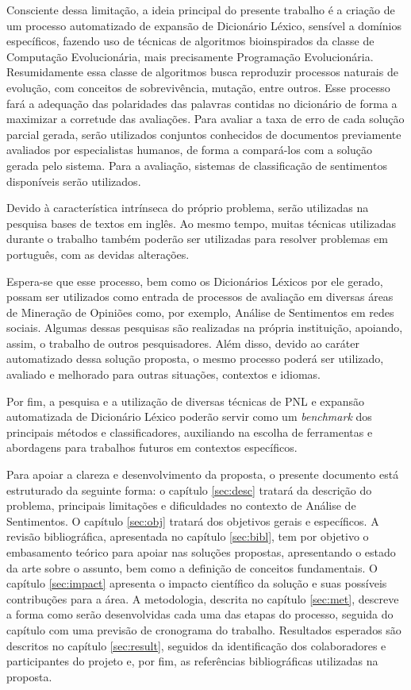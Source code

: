\documentclass[a4paper,11pt]{article}
\begin{document}
Consciente dessa limitação, a ideia principal do presente trabalho é a criação de um processo automatizado de expansão de Dicionário Léxico, sensível a domínios específicos, fazendo uso de técnicas de algoritmos bioinspirados da classe de Computação Evolucionária, mais precisamente Programação Evolucionária. Resumidamente essa classe de algoritmos busca reproduzir processos naturais de evolução, com conceitos de sobrevivência, mutação, entre outros. Esse processo fará a adequação das polaridades das palavras contidas no dicionário de forma a maximizar a corretude das avaliações. Para avaliar a taxa de erro de cada solução parcial gerada, serão utilizados conjuntos conhecidos de documentos previamente avaliados por especialistas humanos, de forma a compará-los com a solução gerada pelo sistema. Para a avaliação, sistemas de classificação de sentimentos disponíveis serão utilizados.

Devido à característica intrínseca do próprio problema, serão utilizadas na pesquisa bases de textos em inglês. Ao mesmo tempo, muitas técnicas utilizadas durante o trabalho também poderão ser utilizadas para resolver problemas em português, com as devidas alterações. 

Espera-se que esse processo, bem como os Dicionários Léxicos por ele gerado, possam ser utilizados como entrada de processos de avaliação em diversas áreas de Mineração de Opiniões como, por exemplo, Análise de Sentimentos em redes sociais. Algumas dessas pesquisas são realizadas na própria instituição, apoiando, assim, o trabalho de outros pesquisadores. Além disso, devido ao caráter automatizado dessa solução proposta, o mesmo processo poderá ser utilizado, avaliado e melhorado para outras situações, contextos e idiomas.

Por fim, a pesquisa e a utilização de diversas técnicas de PNL e expansão automatizada de Dicionário Léxico poderão servir como um \emph{benchmark} dos principais métodos e classificadores, auxiliando na escolha de ferramentas e abordagens para trabalhos futuros em contextos específicos.

Para apoiar a clareza e desenvolvimento da proposta, o presente documento está estruturado da seguinte forma: o capítulo \ref{sec:desc} tratará da descrição do problema, principais limitações e dificuldades no contexto de Análise de Sentimentos. O capítulo \ref{sec:obj} tratará dos objetivos gerais e específicos. A revisão bibliográfica, apresentada no capítulo \ref{sec:bibl}, tem por objetivo o embasamento teórico para apoiar nas soluções propostas, apresentando o estado da arte sobre o assunto, bem como a definição de conceitos fundamentais. O capítulo \ref{sec:impact} apresenta o impacto científico da solução e suas possíveis contribuções para a área. A metodologia, descrita no capítulo \ref{sec:met}, descreve a forma como serão desenvolvidas cada uma das etapas do processo, seguida do capítulo com uma previsão de cronograma do trabalho. Resultados esperados são descritos no capítulo \ref{sec:result}, seguidos da identificação dos colaboradores e participantes do projeto e, por fim, as referências bibliográficas utilizadas na proposta.
\end{document}
